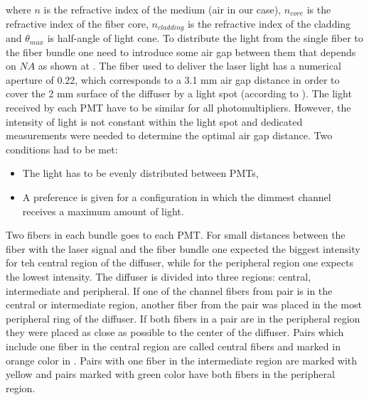 where $n$ is the refractive index of the medium (air in our case), $n_{core}$ is the refractive index of the fiber core, $n_{cladding}$ is the refractive index 
of the cladding and $\theta_{max}$ is half-angle of light cone. 
To distribute the light from the single fiber to the fiber bundle one need to introduce some air gap between them that depends on $NA$ 
as shown at .
The fiber used to deliver the laser light has a numerical aperture of 0.22, which corresponds to a 3.1 mm air gap distance 
in order to cover the 2 mm surface of the diffuser by a light spot (according to ).
The light received by each PMT have to be similar for all photomultipliers.
However, the intensity of light is not constant within the light spot and dedicated measurements were needed to determine the optimal air gap distance.
Two conditions had to be met:
\begin{itemize}
 \item The light has to be evenly distributed between PMTs,
 \item A preference is given for a configuration in which the dimmest channel receives a maximum amount of light.
\end{itemize}
Two fibers in each bundle goes to each PMT. 
For small distances between the fiber with the laser signal and the fiber bundle one expected the biggest intensity for teh central 
region of the diffuser, while for the peripheral region one expects the lowest intensity.
The diffuser is divided into three regions: central, intermediate and peripheral. 
If one of the channel fibers from pair is in the central or intermediate region, another fiber from the pair was placed in the most peripheral ring of the diffuser.
If both fibers in a pair are in the peripheral region they were placed as close as possible to the center of the diffuser.
Pairs which include one fiber in the central region are called central fibers and marked in orange color in .
Pairs with one fiber in the intermediate region are marked with yellow and pairs marked with green color have both fibers in the peripheral region.



